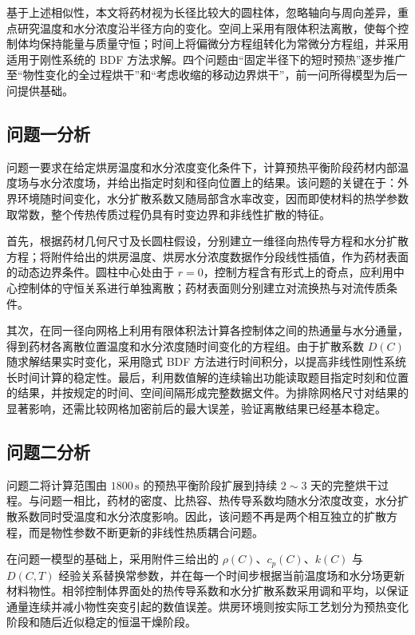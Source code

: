 \documentclass[12pt,a4paper,fontset=none]{ctexart}
\begin{document}
基于上述相似性，本文将药材视为长径比较大的圆柱体，忽略轴向与周向差异，重点研究温度和水分浓度沿半径方向的变化。空间上采用有限体积法离散，使每个控制体均保持能量与质量守恒；时间上将偏微分方程组转化为常微分方程组，并采用适用于刚性系统的 BDF 方法求解。四个问题由“固定半径下的短时预热”逐步推广至“物性变化的全过程烘干”和“考虑收缩的移动边界烘干”，前一问所得模型为后一问提供基础。

\subsection{问题一分析}

问题一要求在给定烘房温度和水分浓度变化条件下，计算预热平衡阶段药材内部温度场与水分浓度场，并给出指定时刻和径向位置上的结果。该问题的关键在于：外界环境随时间变化，水分扩散系数又随局部含水率改变，因而即使材料的热学参数取常数，整个传热传质过程仍具有时变边界和非线性扩散的特征。

首先，根据药材几何尺寸及长圆柱假设，分别建立一维径向热传导方程和水分扩散方程；将附件给出的烘房温度、烘房水分浓度数据作分段线性插值，作为药材表面的动态边界条件。圆柱中心处由于 $r=0$，控制方程含有形式上的奇点，应利用中心控制体的守恒关系进行单独离散；药材表面则分别建立对流换热与对流传质条件。

其次，在同一径向网格上利用有限体积法计算各控制体之间的热通量与水分通量，得到药材各离散位置温度和水分浓度随时间变化的方程组。由于扩散系数 $D(C)$ 随求解结果实时变化，采用隐式 BDF 方法进行时间积分，以提高非线性刚性系统长时间计算的稳定性。最后，利用数值解的连续输出功能读取题目指定时刻和位置的结果，并按规定的时间、空间间隔形成完整数据文件。为排除网格尺寸对结果的显著影响，还需比较网格加密前后的最大误差，验证离散结果已经基本稳定。

\subsection{问题二分析}

问题二将计算范围由 $1800\,\mathrm{s}$ 的预热平衡阶段扩展到持续 $2\sim3$ 天的完整烘干过程。与问题一相比，药材的密度、比热容、热传导系数均随水分浓度改变，水分扩散系数同时受温度和水分浓度影响。因此，该问题不再是两个相互独立的扩散方程，而是物性参数不断更新的非线性热质耦合问题。

在问题一模型的基础上，采用附件三给出的 $\rho(C)$、$c_p(C)$、$k(C)$ 与 $D(C,T)$ 经验关系替换常参数，并在每一个时间步根据当前温度场和水分场更新材料物性。相邻控制体界面处的热传导系数和水分扩散系数采用调和平均，以保证通量连续并减小物性突变引起的数值误差。烘房环境则按实际工艺划分为预热变化阶段和随后近似稳定的恒温干燥阶段。
\end{document}
